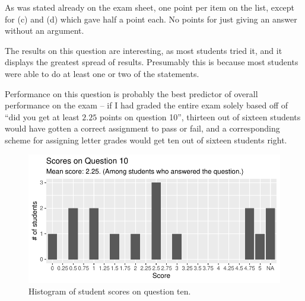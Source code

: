 \documentclass[nobib]{tufte-handout}
\begin{document}
As was stated already on the exam sheet, one point per item on the list, except for (c) and (d) which gave half a point each. No points for just giving an answer without an argument.

The results on this question are interesting, as most students tried it, and it displays the greatest spread of results. Presumably this is because most students were able to do at least one or two of the statements. 

Performance on this question is probably the best predictor of overall performance on the exam -- if I had graded the entire exam solely based off of ``did you get at least $2.25$ points on question 10'', thirteen out of sixteen students would have gotten a correct assignment to pass or fail, and a corresponding scheme for assigning letter grades would get ten out of sixteen students right.

\begin{figure}
  \centering
  \includegraphics[width = \textwidth]{Q10.pdf}
  \caption[Score histogram for Q10]{Histogram of student scores on question ten.}
  \label{fig:Q10}
\end{figure}
\end{document}
